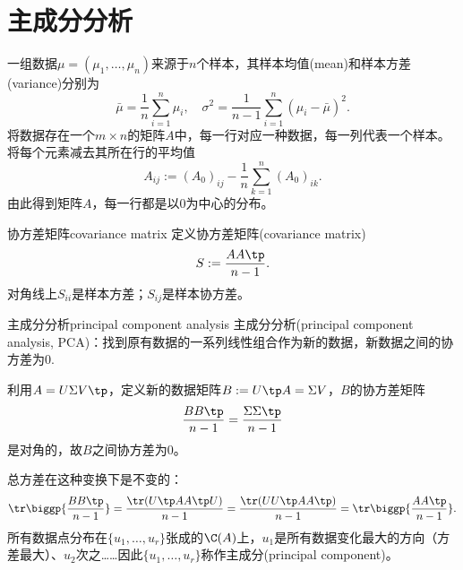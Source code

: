 \section{主成分分析}
一组数据$\mu=(\mu_1,\ldots,\mu_n)$来源于$n$个样本，其样本均值(mean)和样本方差(variance)分别为
\[
	\bar\mu=\frac1n\sum_{i=1}^n\mu_i,\quad\sigma^2=\frac1{n-1}\sum_{i=1}^n(\mu_i-\bar\mu)^2.
\]
将数据存在一个$m\times n$的矩阵$A$中，每一行对应一种数据，每一列代表一个样本。将每个元素减去其所在行的平均值
\[
	A_{ij}:=(A_0)_{ij}-\frac1n\sum_{k=1}^n(A_0)_{ik}.
\]
由此得到矩阵$A$，每一行都是以0为中心的分布。
\begin{definition}{协方差矩阵}{covariance matrix}
	定义协方差矩阵(covariance matrix)
	\begin{equation}
		S:=\frac{AA\tp}{n-1}.
	\end{equation}
	对角线上$S_{ii}$是样本方差；$S_{ij}$是样本协方差。
\end{definition}
\begin{method}{主成分分析}{principal component analysis}
	主成分分析(principal component analysis, PCA)：找到原有数据的一系列线性组合作为新的数据，新数据之间的协方差为0.
\end{method}
利用$A=U\Sigma V\tp$，定义新的数据矩阵$B:=U\tp A=\Sigma V$，$B$的协方差矩阵
\[
	\frac{BB\tp}{n-1}=\frac{\Sigma\Sigma\tp}{n-1}
\]
是对角的，故$B$之间协方差为0。

总方差在这种变换下是不变的：
\[
	\tr\biggp{\frac{BB\tp}{n-1}}=\frac{\tr(U\tp AA\tp U)}{n-1}=\frac{\tr(UU\tp AA\tp)}{n-1}=\tr\biggp{\frac{AA\tp}{n-1}}.
\]
所有数据点分布在$\{u_1,\ldots,u_r\}$张成的$\C(A)$上，$u_1$是所有数据变化最大的方向（方差最大）、$u_2$次之……因此$\{u_1,\ldots,u_r\}$称作主成分(principal component)。
